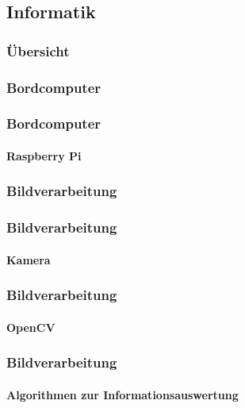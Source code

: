 \subsection{Informatik}

\author{Alexander Suter}

\begin{frame}
	\frametitle{Übersicht\hfill{}\footnotesize \group}

\end{frame}

\subsubsection{Bordcomputer}
\begin{frame}
	\frametitle{Bordcomputer\hfill{}\footnotesize \group}
	\framesubtitle{Raspberry Pi}
\end{frame}

\subsubsection{Bildverarbeitung}
\begin{frame}
	\frametitle{Bildverarbeitung\hfill{}\footnotesize \group}
	\framesubtitle{Kamera}
\end{frame}

\begin{frame}
	\frametitle{Bildverarbeitung\hfill{}\footnotesize \group}
	\framesubtitle{OpenCV}
\end{frame}

\begin{frame}
	\frametitle{Bildverarbeitung\hfill{}\footnotesize \group}
	\framesubtitle{Algorithmen zur Informationsauswertung}
\end{frame}
